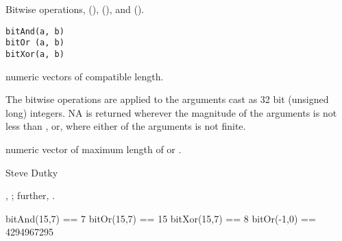 \begin{Description}\relax
Bitwise operations,  (),
 (\code{\LinkA{|}{|}}), and  ().
\end{Description}
\begin{Usage}
\begin{verbatim}
bitAnd(a, b)
bitOr (a, b)
bitXor(a, b)
\end{verbatim}
\end{Usage}
\begin{Arguments}
\begin{ldescription}
\item[\code{a,b}] numeric vectors of compatible length.
\end{ldescription}
\end{Arguments}
\begin{Details}\relax
The bitwise operations are applied to the arguments cast as 32 bit
(unsigned long) integers.  NA is returned wherever the magnitude of the
arguments is not less than , or, where either of the arguments is
not finite.
\end{Details}
\begin{Value}
numeric vector of maximum length of  or .
\end{Value}
\begin{Author}\relax
Steve Dutky
\end{Author}
\begin{SeeAlso}\relax
{}, ; further,
.
\end{SeeAlso}
\begin{Examples}
\begin{ExampleCode}
        bitAnd(15,7) == 7
        bitOr(15,7) == 15
        bitXor(15,7) == 8
        bitOr(-1,0) == 4294967295
\end{ExampleCode}
\end{Examples}

